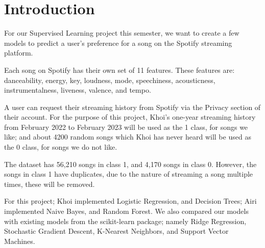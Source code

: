 \section{Introduction}

For our Supervised Learning project this semester, we want to create a few models to predict a user's preference for a song on the Spotify streaming platform.

Each song on Spotify has their own set of 11 features. These features are: danceability, energy, key, loudness, mode, speechiness, acousticness, instrumentalness, liveness, valence, and tempo.

A user can request their streaming history from Spotify via the Privacy section of their account. For the purpose of this project, Khoi's one-year streaming history from February 2022 
to February 2023 will be used as the 1 class, for songs we like; and about 4200 random songs which Khoi has never heard will be used as the 0 class, for songs we do not like.

The dataset has 56,210 songs in class 1, and 4,170 songs in class 0. However, the songs in class 1 have duplicates, due to the nature of streaming a song multiple times, these will be removed.

For this project; Khoi implemented Logistic Regression, and Decision Trees; Airi implemented Naive Bayes, and Random Forest. We also compared our models with existing models from the scikit-learn package; namely Ridge Regression, Stochastic Gradient Descent, K-Nearest Neighbors, and Support Vector Machines.